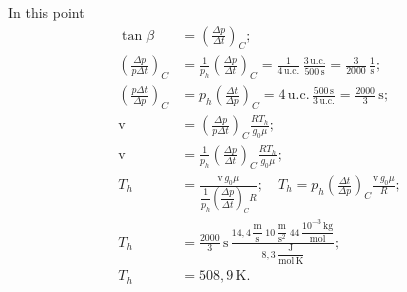 \begin{description}
In this point
\begin{align*}
\tan\beta &= \left(\frac{\Delta p}{\Delta t}\right)_{\!C};\\
\left(\frac{\Delta p}{p\Delta t}\right)_{\!C}
&= \frac{1}{p_h}\left(\frac{\Delta p}{\Delta t}\right)_{\!C}
= \frac{1}{4\,\mathrm{u.c.}}\,\frac{3\,\mathrm{u.c.}}{500\,\mathrm{s}}
= \frac{3}{2000}\,\frac{1}{\mathrm{s}};\\
\left(\frac{p\Delta t}{\Delta p}\right)_{\!C}
&= p_h\left(\frac{\Delta t}{\Delta p}\right)_{\!C}
= 4\,\mathrm{u.c.}\,\frac{500\,\mathrm{s}}{3\,\mathrm{u.c.}}
= \frac{2000}{3}\,\mathrm{s};\\
\mathrm{v} &= \left(\frac{\Delta p}{p\Delta t}\right)_{\!C}\frac{RT_h}{g_0\mu};\\
\mathrm{v} &= \frac{1}{p_h}\left(\frac{\Delta p}{\Delta t}\right)_{\!C}\frac{RT_h}{g_0\mu};\\
T_h &= \frac{\mathrm{v}\,g_0\mu}
{\dfrac{1}{p_h}\left(\dfrac{\Delta p}{\Delta t}\right)_{\!C}R};\quad
T_h = p_h\left(\frac{\Delta t}{\Delta p}\right)_{\!C}\frac{\mathrm{v}\,g_0\mu}{R};\\
T_h &= \frac{2000}{3}\,\mathrm{s}\,
\frac{14{,}4\,\dfrac{\mathrm{m}}{\mathrm{s}}\;10\,\dfrac{\mathrm{m}}{\mathrm{s}^2}\;
      44\,\dfrac{10^{-3}\,\mathrm{kg}}{\mathrm{mol}}}
     {8{,}3\,\dfrac{\mathrm{J}}{\mathrm{mol\,K}}};\\
T_h &= 508{,}9\,\mathrm{K}.
\end{align*}


\end{description}
